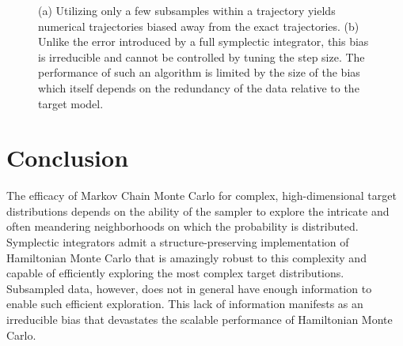 \documentclass{article}
\begin{document}
\begin{figure}
\centering
{}
\caption{(a) Utilizing only a few subsamples within a trajectory yields numerical 
trajectories biased away from the exact trajectories.  (b) Unlike the error introduced 
by a full symplectic integrator, this bias is irreducible and cannot be controlled
by tuning the step size.  The performance of such an algorithm is limited by 
the size of the bias which itself depends on the redundancy of the data relative
to the target model.}
\label{fig:subsample_trajectory}
\end{figure}

\section{Conclusion}

The efficacy of Markov Chain Monte Carlo for complex, high-dimensional 
target distributions depends on the ability of the sampler to explore the intricate 
and often meandering neighborhoods on which the probability is distributed.
Symplectic integrators admit a structure-preserving implementation of
Hamiltonian Monte Carlo that is amazingly robust to this complexity
and capable of efficiently exploring the most complex target distributions.
Subsampled data, however, does not in general have enough information 
to enable such efficient exploration.  This lack of information manifests as
an irreducible bias that devastates the scalable performance of Hamiltonian 
Monte Carlo.
\end{document}

